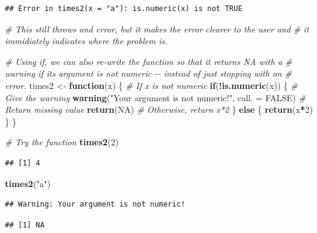 \documentclass[
]{book}
\newenvironment{Shaded}{\begin{snugshade}}{\end{snugshade}}
\newcommand{\AttributeTok}[1]{\textcolor[rgb]{0.13,0.29,0.53}{#1}}
\newcommand{\CommentTok}[1]{\textcolor[rgb]{0.56,0.35,0.01}{\textit{#1}}}
\newcommand{\ConstantTok}[1]{\textcolor[rgb]{0.56,0.35,0.01}{#1}}
\newcommand{\ControlFlowTok}[1]{\textcolor[rgb]{0.13,0.29,0.53}{\textbf{#1}}}
\newcommand{\DecValTok}[1]{\textcolor[rgb]{0.00,0.00,0.81}{#1}}
\newcommand{\FunctionTok}[1]{\textcolor[rgb]{0.13,0.29,0.53}{\textbf{#1}}}
\newcommand{\NormalTok}[1]{#1}
\newcommand{\OtherTok}[1]{\textcolor[rgb]{0.56,0.35,0.01}{#1}}
\newcommand{\SpecialCharTok}[1]{\textcolor[rgb]{0.81,0.36,0.00}{\textbf{#1}}}
\newcommand{\StringTok}[1]{\textcolor[rgb]{0.31,0.60,0.02}{#1}}
\begin{document}
\begin{verbatim}
## Error in times2(x = "a"): is.numeric(x) is not TRUE
\end{verbatim}

\begin{Shaded}
\begin{Highlighting}[]
\CommentTok{\# This still throws and error, but it makes the error clearer to the user and }
\CommentTok{\# it immidiately indicates where the problem is.}

\CommentTok{\# Using if, we can also re{-}write the function so that it returns NA with a}
\CommentTok{\# warning if its argument is not numeric {-}{-} instead of just stopping with an}
\CommentTok{\# error.}
\NormalTok{times2 }\OtherTok{\textless{}{-}} \ControlFlowTok{function}\NormalTok{(x) \{}
  \CommentTok{\# If x is not numeric}
  \ControlFlowTok{if}\NormalTok{(}\SpecialCharTok{!}\FunctionTok{is.numeric}\NormalTok{(x)) \{}
    \CommentTok{\# Give the warning}
    \FunctionTok{warning}\NormalTok{(}\StringTok{"Your argument is not numeric!"}\NormalTok{, }\AttributeTok{call. =} \ConstantTok{FALSE}\NormalTok{)}
    \CommentTok{\# Return missing value}
    \FunctionTok{return}\NormalTok{(}\ConstantTok{NA}\NormalTok{)}
    \CommentTok{\# Otherwise, return x*2}
\NormalTok{  \} }\ControlFlowTok{else}\NormalTok{ \{}
    \FunctionTok{return}\NormalTok{(x}\SpecialCharTok{*}\DecValTok{2}\NormalTok{)}
\NormalTok{  \}}
\NormalTok{\}}

\CommentTok{\# Try the function}
\FunctionTok{times2}\NormalTok{(}\DecValTok{2}\NormalTok{)}
\end{Highlighting}
\end{Shaded}

\begin{verbatim}
## [1] 4
\end{verbatim}

\begin{Shaded}
\begin{Highlighting}[]
\FunctionTok{times2}\NormalTok{(}\StringTok{"a"}\NormalTok{)}
\end{Highlighting}
\end{Shaded}

\begin{verbatim}
## Warning: Your argument is not numeric!
\end{verbatim}

\begin{verbatim}
## [1] NA
\end{verbatim}
\end{document}
